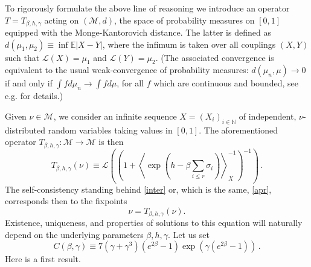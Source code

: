 \documentclass[a4paper,12pt,oneside,reqno]{amsart}
\numberwithin{equation}{section}
\begin{document}
To rigorously formulate the above line of reasoning we introduce an operator $T = T_{{\beta}, h, \gamma}$ acting on $(\mathcal M, d)$, the space of probability measures on $[0,1]$ equipped with the Monge-Kantorovich distance. The latter is defined as $d(\mu_1, \mu_2) {\equiv} \inf {{\mathbb{E}}} \left| X-Y\right|$, where the infimum is taken over all couplings $(X,Y)$ such that $\mathcal L(X)= \mu_1$ and $\mathcal L(Y)= \mu_2$. (The associated convergence is equivalent to the usual weak-convergence of probability measures: $d(\mu_n, \mu) \to 0$ if and only if $\int f d\mu_n \to \int f d\mu$, for all $f$ which are continuous and bounded, see e.g. \cite{talagrand} for details.) 

Given $\nu \in \mathcal M$, we consider an infinite sequence $X = (X_i)_{i\in {\mathbb{N}}}$ of independent, $\nu$-distributed random variables taking values in $[0,1]$. The aforementioned operator 
$T_{{\beta}, h, \gamma}: \mathcal M \to \mathcal M$ is then 
\begin{equation} \label{operator}
T_{{\beta}, h, \gamma}(\nu) {\equiv} \mathcal L\left( \left( 1+\left< \exp\left( h- {\beta} \sum_{i\leq r} {\sigma}_i \right)\right>_X^{-1} \right)^{-1} \right)\,.
\end{equation}
The self-consistency standing behind \eqref{inter} or, which is the same, \eqref{apr}, corresponds then to the fixpoints 
\begin{equation}
\nu = T_{{\beta}, h, \gamma}(\nu). 
\end{equation}
Existence, uniqueness, and properties of solutions to this equation will naturally depend on the underlying parameters ${\beta}, h, \gamma$. Let us set 
\begin{equation} \label{replicasymmetry}
C({\beta}, \gamma) {\equiv} 7\left( \gamma+ \gamma^3 \right)\left( e^{2{\beta}}-1\right)\exp \left( \gamma\left( e^{2{\beta}} - 1 \right)\right)\,.
\end{equation}
Here is a first result. 
\end{document}
